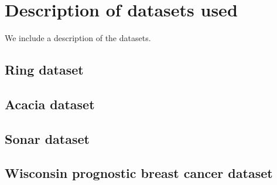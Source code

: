 
\chapter{Description of datasets used}
\label{appendix:datasets}

We include a description of the datasets.

\section{Ring dataset}

\section{Acacia dataset}

\section{Sonar dataset}

\section{Wisconsin prognostic breast cancer dataset}

